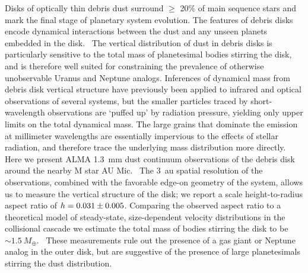 \documentclass[12 pt, letterpaper]{article}
\newcommand{\Mearth}{M_\oplus}
\begin{document}
\abstract
Disks of optically thin debris dust surround $\geq$ 20\% of main sequence stars and mark the final stage of planetary system evolution. 
The features of debris disks encode dynamical interactions between the dust and any unseen planets embedded in the disk.  
The vertical distribution of dust in debris disks is particularly sensitive to the total mass of planetesimal bodies stirring the disk, and is therefore well suited for constraining the prevalence of otherwise unobservable Uranus and Neptune analogs. 
Inferences of dynamical mass from debris disk vertical structure have previously been applied to infrared and optical observations of several systems, but the smaller particles traced by short-wavelength observations are `puffed up' by radiation pressure, yielding only upper limits on the total dynamical mass. 
The large grains that dominate the emission at millimeter wavelengths are essentially impervious to the effects of stellar radiation, and therefore trace the underlying mass distribution more directly. 
Here we present ALMA \SI{1.3}{mm} dust continuum observations of the debris disk around the nearby M star AU Mic.  
The \SI{3}{au} spatial resolution of the observations, combined with the favorable edge-on geometry of the system, allows us to measure the vertical structure of the disk; we report a scale height-to-radius aspect ratio of $h = \num{0.031 \pm 0.005}$. 
Comparing the observed aspect ratio to a theoretical model of steady-state, size-dependent velocity distributions in the collisional cascade we estimate the total mass of bodies stirring the disk to be $\sim \SI{1.5}{\Mearth}$.  
These measurements rule out the presence of a gas giant or Neptune analog in the outer disk, but are suggestive of the presence of large planetesimals stirring the dust distribution.
\end{document}
